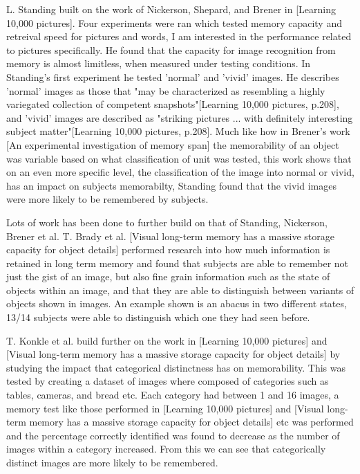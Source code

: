 \documentclass{UoYCSproject}
\begin{document}
L. Standing built on the work of Nickerson, Shepard, and Brener in [Learning 10,000 pictures]. Four experiments were ran which tested memory capacity and retreival speed for pictures and words, I am interested in the performance related to pictures specifically. He found that the capacity for image recognition from memory is almost limitless, when measured under testing conditions. In Standing's first experiment he tested 'normal' and 'vivid' images. He describes 'normal' images as those that "may be characterized as resembling a highly variegated collection of competent snapshots"[Learning 10,000 pictures, p.208], and 'vivid' images are described as "striking pictures ... with definitely interesting subject matter"[Learning 10,000 pictures, p.208]. Much like how in Brener's work [An experimental investigation of memory span] the memorability of an object was variable based on what classification of unit was tested, this work shows that on an even more specific level, the classification of the image into normal or vivid, has an impact on subjects memorabilty, Standing found that the vivid images were more likely to be remembered by subjects.

Lots of work has been done to further build on that of Standing, Nickerson, Brener et al. T. Brady et al. [Visual long-term memory has a massive storage capacity for object details] performed research into how much information is retained in long term memory and found that subjects are able to remember not just the gist of an image, but also fine grain information such as the state of objects within an image, and that they are able to distinguish between variants of objects shown in images. An example shown is an abacus in two different states, 13/14 subjects were able to distinguish which one they had seen before.


T. Konkle et al. build further on the work in [Learning 10,000 pictures] and [Visual long-term memory has a massive storage capacity for object details] by studying the impact that categorical distinctness has on memorability. This was tested by creating a dataset of images where composed of categories such as tables, cameras, and bread etc. Each category had between 1 and 16 images, a memory test like those performed in [Learning 10,000 pictures] and [Visual long-term memory has a massive storage capacity for object details] etc was performed and the percentage correctly identified was found to decrease as the number of images within a category increased. From this we can see that categorically distinct images are more likely to be remembered. 
\end{document}
